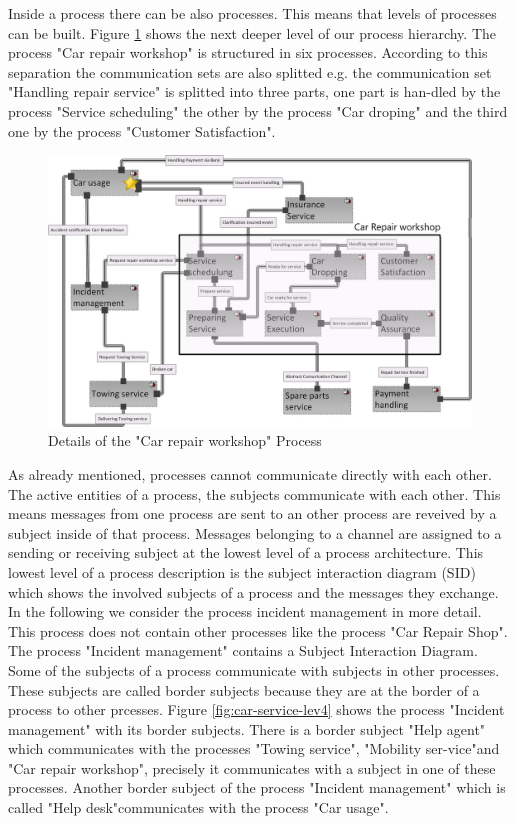 Inside a process there can be also processes. This means that levels of processes can be built. Figure \ref{fig:car-service-lev3} shows the next deeper level of our process hierarchy. The process "Car repair workshop" is structured in six processes. According to this separation the communication sets are also splitted e.g. the communication set "Handling repair service" is splitted into three parts, one part is han-dled by the process "Service scheduling" the other by the process "Car droping" and the third one by the process "Customer Satisfaction".\\

\begin{figure}[htbp]
	\centering
	\includegraphics[width=0.8\linewidth]{Figures/Chapter5/figures-hierarchy/Car-Service-Lev3}
	\caption[Details of the "Car repair workshop" Process]{Details of the "Car repair workshop" Process}
	\label{fig:car-service-lev3}
\end{figure}

As already mentioned, processes cannot communicate directly with each other. The active entities of a process, the subjects communicate with each other. This means messages from one process are sent to an other process are reveived by a subject inside of that process. Messages belonging to a channel are assigned to a sending or receiving subject at the lowest level of a process architecture. This lowest level of a process description is the subject interaction diagram (SID) which shows the involved subjects of a process and the messages they exchange. In the following we consider the process incident management in more detail. This process does not contain other processes like the process "Car Repair Shop". The process "Incident management" contains a Subject Interaction Diagram. Some of the subjects of a process communicate with subjects in other processes. These subjects are called border subjects because they are at the border of a process to other prcesses. Figure \ref{fig:car-service-lev4} shows the process "Incident management" with its border subjects. There is a border subject "Help agent" which communicates with the processes "Towing service", "Mobility ser-vice"and  "Car repair workshop", precisely it communicates with a subject in one of these processes. Another border subject of the process "Incident management" which is called "Help desk"communicates with the process "Car usage".\\

